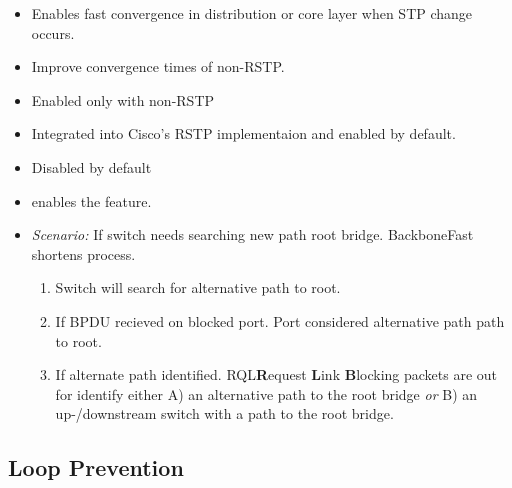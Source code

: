 \begin{itemize}
\begin{itemize}
        \item Enables fast convergence in distribution or core layer when STP change occurs.
        \item Improve convergence times of non-RSTP.
        \item Enabled only with non-RSTP
        \item Integrated into Cisco's RSTP implementaion and enabled by default.
        \item Disabled by default
        \item {} enables the feature.
        \item \textit{Scenario:} If switch needs searching new path root bridge. BackboneFast shortens process.
        \begin{enumerate}
            \item Switch will search for alternative path to root.
            \item If BPDU recieved on blocked port. Port considered alternative path path to root.
            \item If alternate path identified. RQL{\footnotesize \textbf{R}equest \textbf{L}ink \textbf{B}locking} packets are out for identify either A) an alternative path to the root bridge \textit{or} B) an up-/downstream switch with a path to the root bridge.
        \end{enumerate}
    \end{itemize}
\end{itemize}

\subsection{Loop Prevention}

